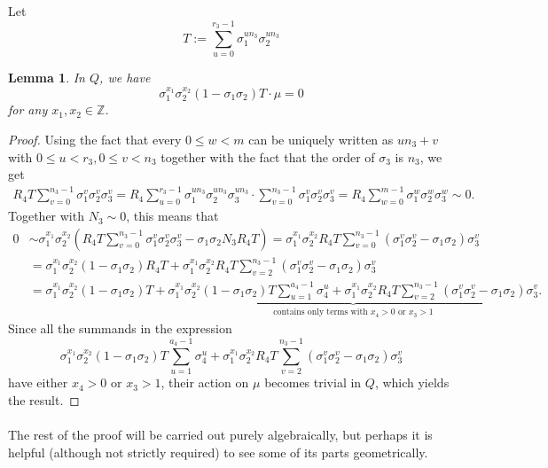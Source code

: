 \documentclass[12pt,a4paper]{article}
\newtheorem{lemma}[theorem]{Lemma}
\theoremstyle{definition}
\newcommand{\Z}{\mathbb{Z}}
\begin{document}
Let $$T:=\sum_{u=0}^{r_3-1}\sigma_1^{un_3}\sigma_2^{un_3}$$

\begin{lemma}\label{Tdiag}
In $Q$, we have $$\sigma_1^{x_1}\sigma_2^{x_2}(1-\sigma_1\sigma_2)T\cdot \mu=0$$
for any $x_1,x_2\in\Z$.
\end{lemma}
\begin{proof}
Using the fact that every $0\leq w<m$ can be uniquely written as $un_3+v$ with $0\leq u<r_3, 0\leq v<n_3$ together with the fact that the order of $\sigma_3$ is $n_3$, we get 
\begin{align*}
R_4T\sum_{v=0}^{n_3-1}\sigma_1^{v}\sigma_2^{v}\sigma_3^{v}=R_4\sum_{u=0}^{r_3-1}\sigma_1^{un_3}\sigma_2^{un_3}\sigma_3^{un_3}\cdot \sum_{v=0}^{n_3-1}\sigma_1^{v}\sigma_2^{v}\sigma_3^{v}=R_4\sum_{w=0}^{m-1}\sigma_1^{w}\sigma_2^{w}\sigma_3^{w}\sim 0.
\end{align*}
Together with $N_3\sim 0$, this means that 
\begin{align*}
0&\sim \sigma_1^{x_1}\sigma_2^{x_2}\left(R_4T \sum_{v=0}^{n_3-1}\sigma_1^{v}\sigma_2^{v}\sigma_3^{v}-\sigma_1\sigma_2N_3R_4T\right)=\sigma_1^{x_1}\sigma_2^{x_2}R_4T\sum_{v=0}^{n_3-1}\left(\sigma_1^{v}\sigma_2^{v}-\sigma_1\sigma_2\right)\sigma_3^{v}\\
&=\sigma_1^{x_1}\sigma_2^{x_2}(1-\sigma_1\sigma_2)R_4T+\sigma_1^{x_1}\sigma_2^{x_2}R_4T\sum_{v=2}^{n_3-1}\left(\sigma_1^{v}\sigma_2^{v}-\sigma_1\sigma_2\right)\sigma_3^{v}\\
&=\sigma_1^{x_1}\sigma_2^{x_2}(1-\sigma_1\sigma_2)T+\underbrace{\sigma_1^{x_1}\sigma_2^{x_2}(1-\sigma_1\sigma_2)T\sum_{u=1}^{a_4-1}\sigma_4^u+\sigma_1^{x_1}\sigma_2^{x_2}R_4T\sum_{v=2}^{n_3-1}\left(\sigma_1^{v}\sigma_2^{v}-\sigma_1\sigma_2\right)\sigma_3^{v}}_{\text{contains only terms with } x_4>0 \text{ or } x_3>1}.
\end{align*}
Since all the summands in the expression $$\sigma_1^{x_1}\sigma_2^{x_2}(1-\sigma_1\sigma_2)T\sum_{u=1}^{a_4-1}\sigma_4^u+\sigma_1^{x_1}\sigma_2^{x_2}R_4T\sum_{v=2}^{n_3-1}\left(\sigma_1^{v}\sigma_2^{v}-\sigma_1\sigma_2\right)\sigma_3^{v}$$
have either $x_4>0$ or $x_3>1$, their action on $\mu$ becomes trivial in $Q$, which yields the result.
\end{proof}
\paragraph*{}
The rest of the proof will be carried out purely algebraically, but perhaps it is helpful (although not strictly required) to see some of its parts geometrically.
\end{document}
